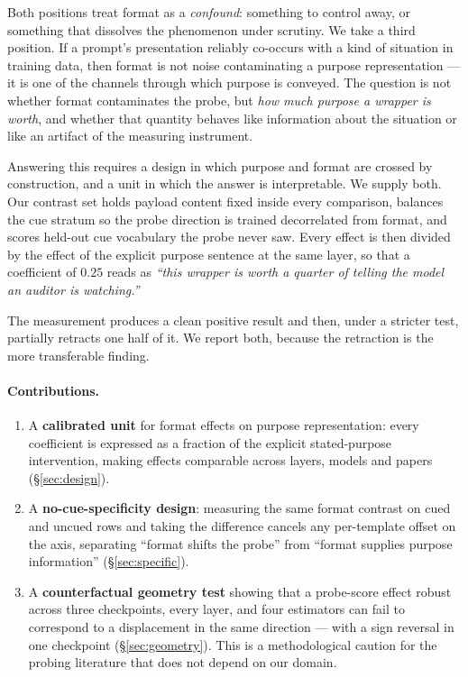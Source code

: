 \documentclass[10pt]{article}
\begin{document}
Both positions treat format as a \emph{confound}: something to control away, or
something that dissolves the phenomenon under scrutiny. We take a third
position. If a prompt's presentation reliably co-occurs with a kind of
situation in training data, then format is not noise contaminating a purpose
representation --- it is one of the channels through which purpose is conveyed.
The question is not whether format contaminates the probe, but \emph{how much
purpose a wrapper is worth}, and whether that quantity behaves like information
about the situation or like an artifact of the measuring instrument.

Answering this requires a design in which purpose and format are crossed by
construction, and a unit in which the answer is interpretable. We supply both.
Our contrast set holds payload content fixed inside every comparison, balances
the cue stratum so the probe direction is trained decorrelated from format, and
scores held-out cue vocabulary the probe never saw. Every effect is then
divided by the effect of the explicit purpose sentence at the same layer, so
that a coefficient of $0.25$ reads as \emph{``this wrapper is worth a quarter of
telling the model an auditor is watching.''}

The measurement produces a clean positive result and then, under a stricter
test, partially retracts one half of it. We report both, because the retraction
is the more transferable finding.

\paragraph{Contributions.}
\begin{enumerate}\itemsep1pt
\item A \textbf{calibrated unit} for format effects on purpose representation:
      every coefficient is expressed as a fraction of the explicit stated-purpose
      intervention, making effects comparable across layers, models and papers
      (\S\ref{sec:design}).
\item A \textbf{no-cue-specificity design}: measuring the same format contrast
      on cued and uncued rows and taking the difference cancels any per-template
      offset on the axis, separating ``format shifts the probe'' from ``format
      supplies purpose information'' (\S\ref{sec:specific}).
\item A \textbf{counterfactual geometry test} showing that a probe-score effect
      robust across three checkpoints, every layer, and four estimators can fail
      to correspond to a displacement in the same direction --- with a sign
      reversal in one checkpoint (\S\ref{sec:geometry}). This is a methodological
      caution for the probing literature that does not depend on our domain.
\end{enumerate}
\end{document}
